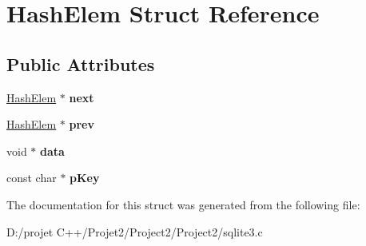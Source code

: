 \hypertarget{struct_hash_elem}{}\section{Hash\+Elem Struct Reference}
\label{struct_hash_elem}
\subsection*{Public Attributes}
\begin{DoxyCompactItemize}
\item 
\mbox{\label{struct_hash_elem_a2d28fad45ff21ffb8a02a7133df860fd}} 
\mbox{\hyperlink{struct_hash_elem}{Hash\+Elem}} $\ast$ {\bfseries next}
\item 
\mbox{\label{struct_hash_elem_ae4d011c0dc807a3c100ccdb927dd0ba9}} 
\mbox{\hyperlink{struct_hash_elem}{Hash\+Elem}} $\ast$ {\bfseries prev}
\item 
\mbox{\label{struct_hash_elem_ac7e80f63ba2f82457ff68aa0cd360365}} 
void $\ast$ {\bfseries data}
\item 
\mbox{\label{struct_hash_elem_a9c33a7c8ac467a5547a123338daf61f4}} 
const char $\ast$ {\bfseries p\+Key}
\end{DoxyCompactItemize}


The documentation for this struct was generated from the following file\+:\begin{DoxyCompactItemize}
\item 
D\+:/projet C++/\+Projet2/\+Project2/\+Project2/sqlite3.\+c\end{DoxyCompactItemize}
